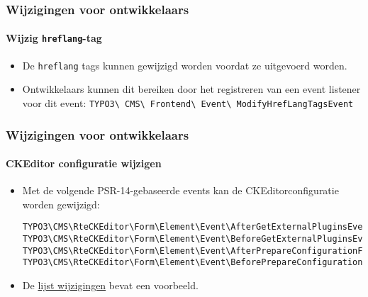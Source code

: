 
\begin{frame}[fragile]
	\frametitle{Wijzigingen voor ontwikkelaars}
	\framesubtitle{Wijzig \texttt{hreflang}-tag}

	\lstset{basicstyle=\smaller\ttfamily}

	\begin{itemize}
		\item De \texttt{hreflang} tags kunnen gewijzigd worden voordat ze uitgevoerd worden.
		\item Ontwikkelaars kunnen dit bereiken door het registreren van een event listener voor dit event:\newline
			\smaller
				\texttt{TYPO3\textbackslash
					CMS\textbackslash
					Frontend\textbackslash
					Event\textbackslash
					ModifyHrefLangTagsEvent}
			\normalsize
	\end{itemize}

\end{frame}


\begin{frame}[fragile]
	\frametitle{Wijzigingen voor ontwikkelaars}
	\framesubtitle{CKEditor configuratie wijzigen}

	\lstset{basicstyle=\tiny\ttfamily}

	\begin{itemize}
		\item Met de volgende PSR-14-gebaseerde events kan de CKEditorconfiguratie worden gewijzigd:

\vspace{-0.4cm}
\begin{lstlisting}
TYPO3\CMS\RteCKEditor\Form\Element\Event\AfterGetExternalPluginsEvent
TYPO3\CMS\RteCKEditor\Form\Element\Event\BeforeGetExternalPluginsEvent
TYPO3\CMS\RteCKEditor\Form\Element\Event\AfterPrepareConfigurationForEditorEvent
TYPO3\CMS\RteCKEditor\Form\Element\Event\BeforePrepareConfigurationForEditorEvent
\end{lstlisting}

		\item De
			\href{https://docs.typo3.org/c/typo3/cms-core/master/en-us/Changelog/10.3/Feature-88818-IntroduceEventsToModifyCKEditorConfiguration.html}{lijst wijzigingen}
			bevat een voorbeeld.
	\end{itemize}

\end{frame}

